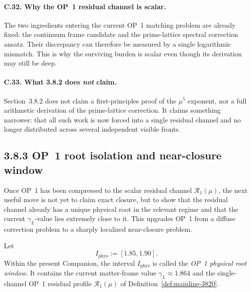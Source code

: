 \paragraph{C.32. Why the OP~1 residual channel is scalar.}
The two ingredients entering the current OP~1 matching problem are already fixed: the continuum frame candidate and the prime-lattice spectral correction ansatz. Their discrepancy can therefore be measured by a single logarithmic mismatch. This is why the surviving burden is scalar even though its derivation may still be deep.

\paragraph{C.33. What 3.8.2 does \emph{not} claim.}
Section~3.8.2 does not claim a first-principles proof of the \(\mu^5\) exponent, nor a full arithmetic derivation of the prime-lattice correction. It claims something narrower: that all such work is now forced into a single residual channel and no longer distributed across several independent visible fronts.


\subsection*{3.8.3 OP~1 root isolation and near-closure window}
Once OP~1 has been compressed to the scalar residual channel \(\mathcal R_{1}(\mu)\), the next useful move is not yet to claim exact closure, but to show that the residual channel already has a unique physical root in the relevant regime and that the current \(\gamma_L\)-value lies extremely close to it. This upgrades OP~1 from a diffuse correction problem to a sharply localized near-closure problem.

\begin{definition}
\label{def:mainline-3830}
Let
\[
  I_{\mathrm{phys}}:=[1.85,1.90].
\]
Within the present Companion, the interval \(I_{\mathrm{phys}}\) is called the \emph{OP~1 physical root window}. It contains the current matter-frame value \(\gamma_L\approx 1.864\) and the single-channel OP~1 residual profile \(\mathcal R_1(\mu)\) of Definition~\ref{def:mainline-3820}.
\end{definition}

